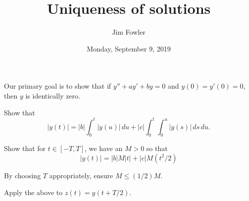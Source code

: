 \documentclass{homework}
\author{Jim Fowler}
\title{Uniqueness of solutions}
\date{Monday, September 9, 2019}
\begin{document}
\maketitle

Our primary goal is to show that if $y'' + ay' + by = 0$ and
$y(0) = y'(0) = 0$, then $y$ is identically zero.

\begin{problem}
Show that
\[
  |y(t)| = |b| \int_0^{t} |y(u)| \, du + |c| \int_0^{t} \int_0^u |y(s)| \, ds \, du.
\]
\end{problem}

\vfill

\begin{problem}
Show that for $t \in [-T,T]$, we have an $M > 0$ so that
\[
  |y(t)| = |b| M |t| + |c| M (t^2/2)
\]
\end{problem}

\vfill

\begin{problem}
  By choosing $T$ appropriately, ensure $M \leq (1/2) M$.
\end{problem}

\vfill

\begin{problem}
  Apply the above to $z(t) = y(t + T/2)$.
\end{problem}

\vfill
\end{document}
